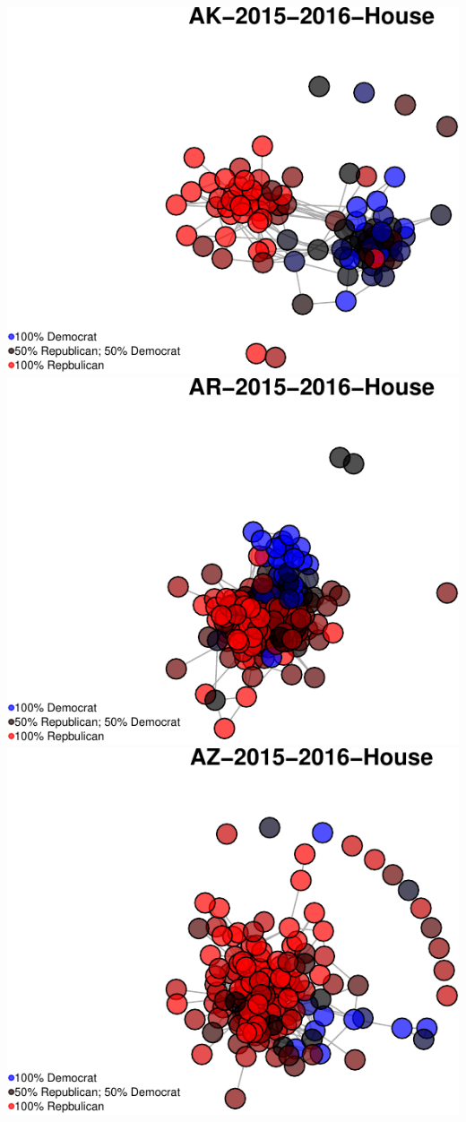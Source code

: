 \documentclass[]{article}
\begin{document}
\includegraphics{Final_Project_RMarkdown_Updated_files/figure-latex/unnamed-chunk-10-1.pdf}
\includegraphics{Final_Project_RMarkdown_Updated_files/figure-latex/unnamed-chunk-10-2.pdf}
\includegraphics{Final_Project_RMarkdown_Updated_files/figure-latex/unnamed-chunk-10-3.pdf}
\end{document}
